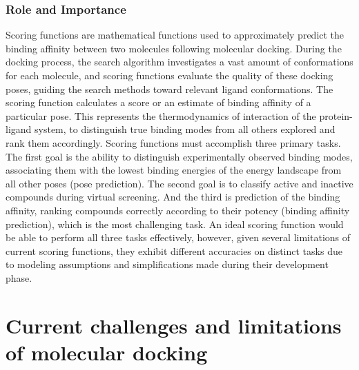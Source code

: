 \documentclass[12pt, a4paper]{article}
\begin{document}
\subsubsection{Role and Importance}
Scoring functions are mathematical functions\cite{CH1_20} used to approximately predict the binding affinity between two molecules following molecular docking. During the docking process, the search algorithm investigates a vast amount of conformations for each molecule, and scoring functions evaluate the quality of these docking poses, guiding the search methods toward relevant ligand conformations.
The scoring function calculates a score or an estimate of binding affinity of a particular pose. This  represents the thermodynamics of interaction of the protein-ligand system, to distinguish true binding modes from all others explored and rank them accordingly. Scoring functions must accomplish three primary tasks. The first goal is the ability to distinguish experimentally observed binding modes, associating them with the lowest binding energies of the energy landscape from all other poses (pose prediction). The second goal is to classify active and inactive compounds during virtual screening. And the third is prediction of the binding affinity, ranking compounds correctly according to their potency (binding affinity prediction), which is the most challenging task. An ideal scoring function would be able to perform all three tasks effectively, however, given several limitations of current scoring functions, they exhibit different accuracies on distinct tasks due to modeling assumptions and simplifications made during their development phase. 

\section{Current challenges and limitations of molecular docking}
\end{document}
